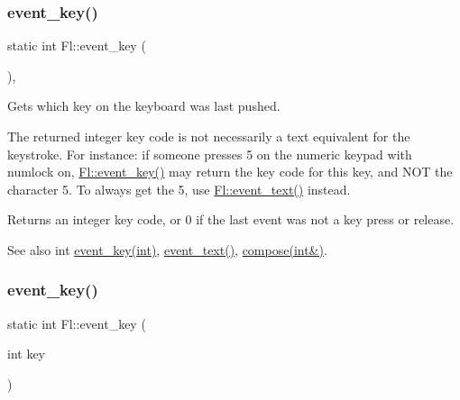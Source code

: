 \subsubsection{\texorpdfstring{event\+\_\+key()}{event\_key()}\hspace{0.1cm}{\footnotesize\ttfamily [1/2]}}
{\footnotesize\ttfamily static int Fl\+::event\+\_\+key (\begin{DoxyParamCaption}{ }\end{DoxyParamCaption})\hspace{0.3cm}{\ttfamily [inline]}, {\ttfamily [static]}}

Gets which key on the keyboard was last pushed.

The returned integer \textquotesingle{}key code\textquotesingle{} is not necessarily a text equivalent for the keystroke. For instance\+: if someone presses \textquotesingle{}5\textquotesingle{} on the numeric keypad with numlock on, \hyperlink{group__fl__events_ga1ac131e3cd5ca674cc022b1f77233449}{Fl\+::event\+\_\+key()} may return the \textquotesingle{}key code\textquotesingle{} for this key, and N\+OT the character \textquotesingle{}5\textquotesingle{}. To always get the \textquotesingle{}5\textquotesingle{}, use \hyperlink{group__fl__events_ga6647c55948fe1d8be9367267529e9c54}{Fl\+::event\+\_\+text()} instead.

\begin{DoxyReturn}{Returns}
an integer \textquotesingle{}key code\textquotesingle{}, or 0 if the last event was not a key press or release. 
\end{DoxyReturn}
\begin{DoxySeeAlso}{See also}
int \hyperlink{group__fl__events_ga0647361133efe8f9bdbcf6d462116236}{event\+\_\+key(int)}, \hyperlink{group__fl__events_ga6647c55948fe1d8be9367267529e9c54}{event\+\_\+text()}, \hyperlink{group__fl__events_ga2c16ab49eb753b98f3d8f1e96429d094}{compose(int\&)}. 
\end{DoxySeeAlso}
\mbox{\label{group__fl__events_ga0647361133efe8f9bdbcf6d462116236}} 
\subsubsection{\texorpdfstring{event\+\_\+key()}{event\_key()}\hspace{0.1cm}{\footnotesize\ttfamily [2/2]}}
{\footnotesize\ttfamily static int Fl\+::event\+\_\+key (\begin{DoxyParamCaption}\item[{int}]{key }\end{DoxyParamCaption})\hspace{0.3cm}{\ttfamily [static]}}

